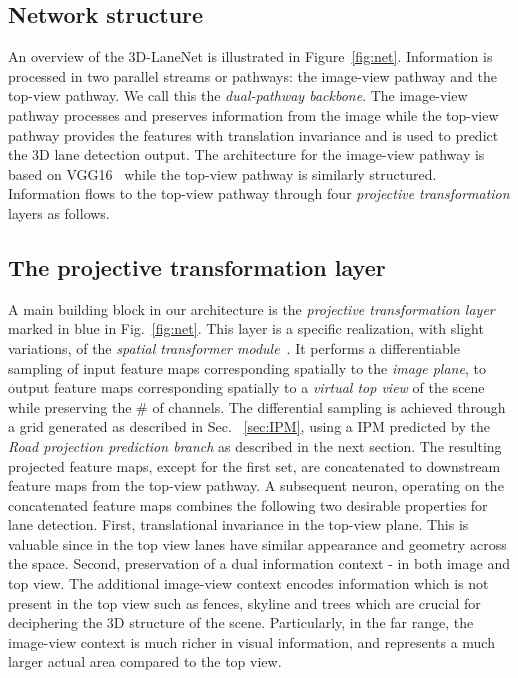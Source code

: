 \documentclass[10pt,twocolumn,letterpaper]{article}
\begin{document}
\label{sec:dual_block}






\subsection{Network structure}

An overview of the 3D-LaneNet is illustrated in Figure~\ref{fig:net}. Information is processed in two parallel streams or pathways: the image-view pathway and the top-view pathway. We call this the \emph{dual-pathway backbone}. The image-view pathway processes and preserves information from the image while the top-view pathway provides the features with translation invariance and is used to predict the 3D lane detection output. The architecture for the image-view pathway is based on VGG16~\cite{VGG} while the top-view pathway is similarly structured. Information flows to the top-view pathway through four \textit{projective transformation} layers as follows. 



\subsection{The projective transformation layer}

A main building block in our architecture is the \emph{projective transformation layer} marked in blue in Fig.~\ref{fig:net}. This layer is a specific realization, with slight variations, of the \textit{spatial transformer  module}~\cite{spatial_transform}. It performs a differentiable sampling of input feature maps corresponding spatially to the \textit{image plane}, to output feature maps corresponding spatially to a \textit{virtual top view} of the scene while preserving the \# of channels. The differential sampling is achieved through a grid generated as described in Sec. ~\ref{sec:IPM}, using a IPM predicted by the \textit{Road projection prediction branch} as described in the next section. The resulting projected feature maps, except for the first set, are concatenated to downstream feature maps from the top-view pathway. A subsequent neuron, operating on the concatenated feature maps combines the following two desirable properties for lane detection. First, translational invariance in the top-view plane. This is valuable since in the top view lanes have similar appearance and geometry across the space. Second, preservation of a dual information context - in both image and top view. The additional image-view context encodes information which is not present in the top view such as fences, skyline and trees which are crucial for deciphering the 3D structure of the scene. Particularly, in the far range, the image-view context is much richer in visual information, and represents a much larger actual area compared to the top view.
\end{document}
